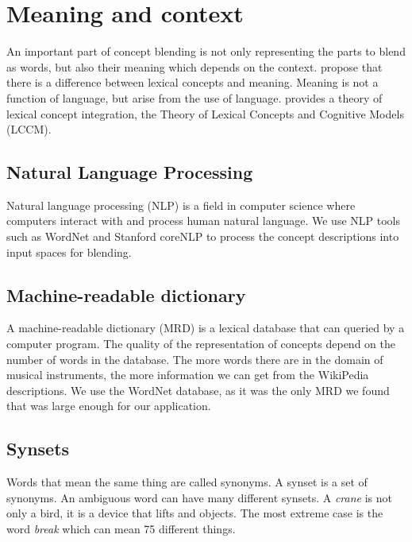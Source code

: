 

\section{Meaning and context}
An important part of concept blending is not only representing the parts to blend as words, but also their meaning which depends on the context. \parencite{Reference6} propose that there is a difference between lexical concepts and meaning. Meaning is not a function of language, but arise from the use of language. \parencite{Reference6} provides a theory of lexical concept integration, the Theory of Lexical Concepts and Cognitive Models (LCCM). 




\subsection{Natural Language Processing}
Natural language processing (NLP) is a field in computer science where computers interact with and process human natural language. We use NLP tools such as WordNet and Stanford coreNLP to process the concept descriptions into input spaces for blending.
\subsection{Machine-readable dictionary}
A machine-readable dictionary (MRD) is a lexical database that can queried by a computer program.
The quality of the representation of concepts depend on the number of words in the database.
The more words there are in the domain of musical instruments, the more information we can get from the WikiPedia descriptions.
We use the WordNet database, as it was the only MRD we found that was large enough for our application. \parencite{fellbaum1998wordnet}

\subsection{Synsets}
Words that mean the same thing are called synonyms. A synset is a set of synonyms. An ambiguous word can have many different synsets. A \emph{crane} is not only a bird, it is a device that lifts and objects. The most extreme case is the word \emph{break} which can mean 75 different things.

